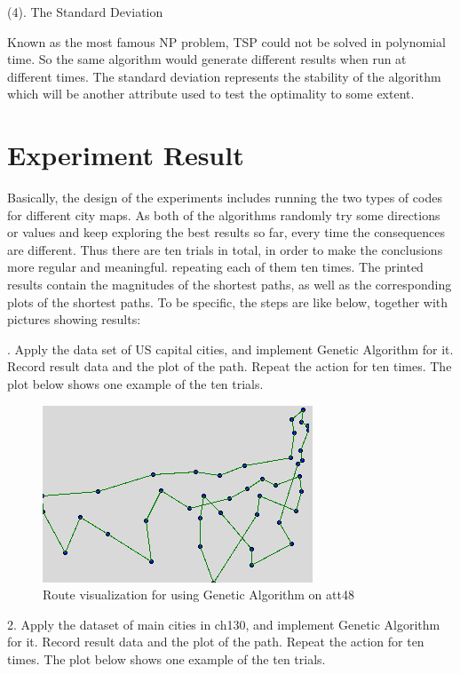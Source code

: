 \documentclass{article}
\begin{document}
(4). The Standard Deviation 

Known as the most famous NP problem, TSP could not be solved in polynomial time. So the same algorithm would generate different results when run at different times. The standard deviation represents the stability of the algorithm which will be another attribute used to test the optimality to some extent.

\section{Experiment Result}
Basically, the design of the experiments includes running the two types of codes for different city maps. As both of the algorithms randomly try some directions or values and keep exploring the best results so far, every time the consequences are different. Thus there are ten trials in total, in order to make the conclusions more regular and meaningful. repeating each of them ten times. The printed results contain the magnitudes of the shortest paths, as well as the corresponding plots of the shortest paths. To be specific, the steps are like below, together with pictures showing results:

. Apply the data set of US capital cities, and implement Genetic Algorithm for it. Record result data and the plot of the path. Repeat the action for ten times. The plot below shows one example of the ten trials. 



\bigskip
\begin{figure}[h]
  \begin{center}
    \includegraphics[scale=0.7]{image1}
  \end{center}
  \caption{Route visualization for using Genetic Algorithm on att48}
\end{figure}
\bigskip



2. Apply the dataset of main cities in ch130, and implement Genetic Algorithm for it. Record result data and the plot of the path. Repeat the action for ten times. The plot below shows one example of the ten trials. 
\end{document}

